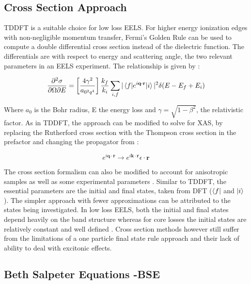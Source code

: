 \subsection{Cross Section Approach}
TDDFT is a suitable choice for low loss EELS.  For higher energy ionization edges with non-negligible momentum transfer, Fermi's Golden Rule can be used to compute a double differential cross section instead of the dielectric function.  The differentials are with respect to energy and scattering angle, the two relevant parameters in an EELS experiment.  The relationship is given by \cite{hebert_practical_2007}:

\begin{equation}
		\frac{\partial^2 \sigma}{\partial \Omega \partial E} = \left[\frac{4\gamma^2}{a_{\mathrm{0}^2q^4}}\right] \frac{k_f}{k_i} \sum_{i,f}|\mel{f}{e^{i\textbf{q}\cdot\textbf{r}}}{i}|^2\delta(E-E_f+E_i)
		\label{telnes_eq}
\end{equation}

Where $a_0$ is the Bohr radius, E the energy loss and $\gamma = \sqrt{1- \beta^2}$, the relativistic factor.  As in TDDFT, the approach can be modified to solve for XAS, by replacing the Rutherford cross section with the Thompson cross section in the prefactor and changing the propagator from \cite{ankudinov_real-space_1998}:

\begin{equation}
	e^{i\textbf{q}\cdot\textbf{r}} \to e^{i\textbf{k}\cdot\textbf{r}}\epsilon \cdot \textbf{r}
\end{equation}

The cross section formalism can also be modified to account for anisotropic samples as well as some experimental parameters \cite{hebert_practical_2007}. Similar to TDDFT, the essential parameters are the initial and final states, taken from DFT ($\bra{f}$ and $\ket{i}$).  The simpler approach with fewer approximations can be attributed to the states being investigated.  In low loss EELS, both the initial and final states depend heavily on the band structure whereas for core losses the initial states are relatively constant and well defined \cite{hebert_practical_2007}.  Cross section methods however still suffer from the limitations of a one particle final state rule approach and their lack of ability to deal with excitonic effects.  

\subsection{Beth Salpeter Equations -BSE}

